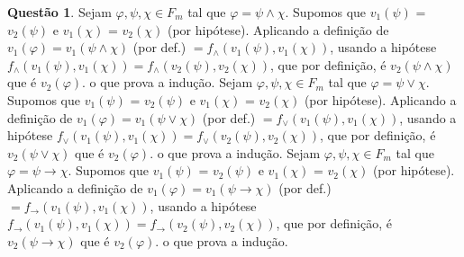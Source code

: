 \documentclass[tikz,border=5]{article}
\theoremstyle{definition}
\newtheorem{exerc}{Questão}
\begin{document}
	\begin{exerc}
		Sejam $\varphi, \psi, \chi \in F_m$ tal que $\varphi = \psi \wedge \chi.$ Supomos que $v_1(\psi)$ = $v_2(\psi)$ e $v_1(\chi)$ = $v_2(\chi)$ (por hipótese). Aplicando a definição de $v_1(\varphi) = v_1(\psi \wedge \chi)$ (por def.) $= f_{\wedge}(v_1(\psi), v_1(\chi))$, usando a hipótese $f_{\wedge}(v_1(\psi), v_1(\chi)) = f_{\wedge}(v_2(\psi), v_2(\chi))$, que por definição, é $v_2(\psi \wedge \chi)$ que é $v_2(\varphi)$. o que prova a indução.
		\newline Sejam $\varphi, \psi, \chi \in F_m$ tal que $\varphi = \psi \vee \chi.$  Supomos que $v_1(\psi)$ = $v_2(\psi)$ e $v_1(\chi)$ = $v_2(\chi)$ (por hipótese). Aplicando a definição de $v_1(\varphi) = v_1(\psi \vee \chi)$ (por def.) $= f_{\vee}(v_1(\psi), v_1(\chi))$, usando a hipótese $f_{\vee}(v_1(\psi), v_1(\chi)) = f_{\vee}(v_2(\psi), v_2(\chi))$, que por definição, é $v_2(\psi \vee \chi)$ que é $v_2(\varphi)$. o que prova a indução.
		\newline Sejam $\varphi, \psi, \chi \in F_m$ tal que $\varphi = \psi \rightarrow \chi.$  Supomos que $v_1(\psi)$ = $v_2(\psi)$ e $v_1(\chi)$ = $v_2(\chi)$ (por hipótese). Aplicando a definição de $v_1(\varphi) = v_1(\psi \rightarrow \chi)$ (por def.) $= f_{\rightarrow}(v_1(\psi), v_1(\chi))$, usando a hipótese $f_{\rightarrow}(v_1(\psi), v_1(\chi)) = f_{\rightarrow}(v_2(\psi), v_2(\chi))$, que por definição, é $v_2(\psi \rightarrow \chi)$ que é $v_2(\varphi)$. o que prova a indução.		
	\end{exerc}
\end{document}
